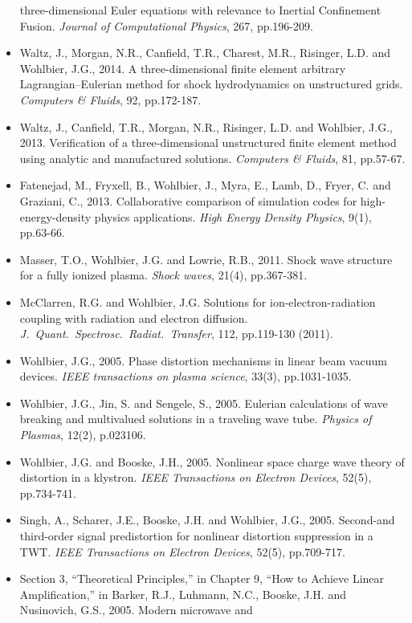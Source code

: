 \documentclass{muratcan_cv}
\begin{document}
\begin{itemize}
  three-dimensional Euler equations with relevance to Inertial
  Confinement Fusion. {\it Journal of Computational Physics}, 267,
  pp.196-209.
\item Waltz, J., Morgan, N.R., Canfield, T.R., Charest, M.R.,
  Risinger, L.D. and Wohlbier, J.G., 2014. A three-dimensional
  finite element arbitrary Lagrangian–Eulerian method for shock
  hydrodynamics on unstructured grids. {\it Computers \& Fluids}, 92,
  pp.172-187.
\item Waltz, J., Canfield, T.R., Morgan, N.R., Risinger, L.D. and
  Wohlbier, J.G., 2013. Verification of a three-dimensional
  unstructured finite element method using analytic and manufactured
  solutions. {\it Computers \& Fluids}, 81, pp.57-67.
\item Fatenejad, M., Fryxell, B., Wohlbier, J., Myra, E., Lamb, D.,
  Fryer, C. and Graziani, C., 2013. Collaborative comparison of
  simulation codes for high-energy-density physics applications. {\it High
    Energy Density Physics}, 9(1), pp.63-66.
\item Masser, T.O., Wohlbier, J.G. and Lowrie, R.B., 2011. Shock wave
  structure for a fully ionized plasma. {\it Shock waves}, 21(4),
  pp.367-381.
\item McClarren, R.G. and Wohlbier, J.G. Solutions for
  ion-electron-radiation coupling with radiation and electron
  diffusion. {\it J.~Quant.~Spectrosc.~Radiat.~Transfer}, 112, pp.119-130
  (2011).
\item Wohlbier, J.G., 2005. Phase distortion mechanisms in linear beam
  vacuum devices. {\it IEEE transactions on plasma science}, 33(3),
  pp.1031-1035.
\item Wohlbier, J.G., Jin, S. and Sengele, S., 2005. Eulerian
  calculations of wave breaking and multivalued solutions in a
  traveling wave tube. {\it Physics of Plasmas}, 12(2), p.023106.
\item Wohlbier, J.G. and Booske, J.H., 2005. Nonlinear space charge
  wave theory of distortion in a klystron. {\it IEEE Transactions on
    Electron Devices}, 52(5), pp.734-741.
\item Singh, A., Scharer, J.E., Booske, J.H. and Wohlbier, J.G.,
  2005. Second-and third-order signal predistortion for nonlinear
  distortion suppression in a TWT. {\it IEEE Transactions on Electron
    Devices}, 52(5), pp.709-717.
\item Section 3, ``Theoretical Principles,'' in Chapter 9,
  ``How to Achieve Linear Amplification,'' in Barker, R.J., Luhmann,
  N.C., Booske, J.H. and Nusinovich, G.S., 2005. Modern microwave and

\end{itemize}
\end{document}
